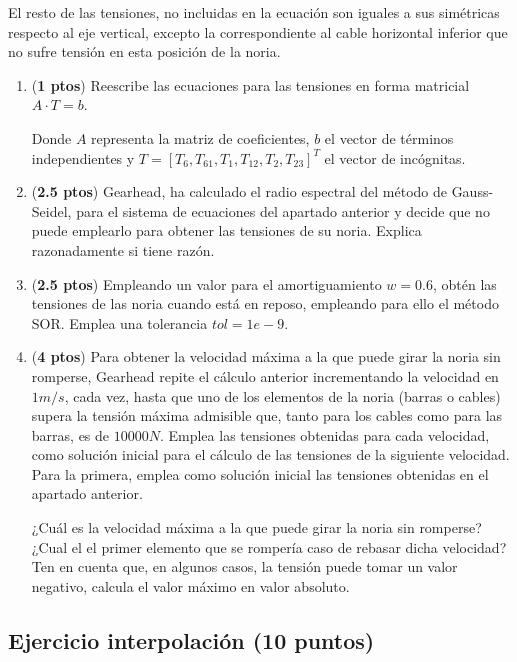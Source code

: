 El resto de las tensiones, no incluidas en la ecuación son iguales a sus simétricas respecto al eje vertical, excepto la correspondiente al cable horizontal inferior que no sufre tensión en esta posición de la noria.
\begin{enumerate}
	\item (\textbf{1 ptos}) Reescribe las ecuaciones para las tensiones en forma matricial $A\cdot T=b$.
	
	Donde $A$ representa la matriz de coeficientes, $b$ el vector de términos independientes y $T = [T_6,T_{61},T_1,T_{12},T_2,T_{23}]^T$ el vector de incógnitas.
	
	\item (\textbf{2.5 ptos}) Gearhead, ha calculado el radio espectral del método de Gauss-Seidel, para el sistema de ecuaciones del apartado anterior y decide que no puede emplearlo para obtener las tensiones de su noria. Explica razonadamente si tiene razón.
	
	\item (\textbf{2.5 ptos}) Empleando un valor para el amortiguamiento $w = 0.6$, obtén las tensiones de las noria cuando está en reposo, empleando para ello el método SOR. Emplea una tolerancia $tol=1e-9$.
	
	\item (\textbf{4 ptos}) Para obtener la velocidad máxima a la que puede girar la noria sin romperse, Gearhead repite el cálculo anterior incrementando la velocidad en $1m/s$, cada vez, hasta que uno de los elementos de la noria (barras o cables) supera la tensión máxima admisible que, tanto para los cables como para las barras, es de $10000N$. Emplea las tensiones obtenidas para cada velocidad, como solución inicial para el cálculo de las tensiones de la siguiente velocidad. Para la primera, emplea como solución inicial las tensiones obtenidas en el apartado anterior.
	
	¿Cuál es la velocidad máxima a la que puede girar la noria sin romperse? ¿Cual el el primer elemento que se rompería caso de rebasar dicha velocidad? Ten en cuenta que, en algunos casos, la tensión puede tomar un valor negativo, calcula el valor máximo en valor absoluto.
\end{enumerate}



\subsection*{Ejercicio interpolación (10 puntos)}

